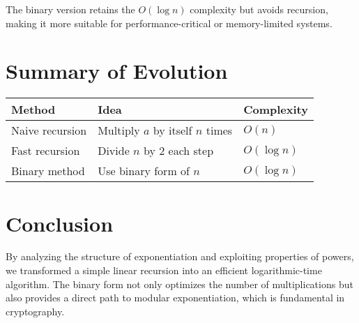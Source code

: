\documentclass[a4paper,12pt]{article}
\begin{document}
The binary version retains the \( O(\log n) \) complexity but avoids recursion,
making it more suitable for performance-critical or memory-limited systems.

\section{Summary of Evolution}

\begin{center}
    \begin{tabular}{|l|l|l|}
        \hline
        \textbf{Method} & \textbf{Idea} & \textbf{Complexity} \\
        \hline
        Naive recursion & Multiply $a$ by itself $n$ times & $O(n)$ \\
        Fast recursion & Divide $n$ by 2 each step & $O(\log n)$ \\
        Binary method & Use binary form of $n$ & $O(\log n)$ \\
        \hline
    \end{tabular}
\end{center}

\section{Conclusion}

By analyzing the structure of exponentiation and exploiting properties of powers,
we transformed a simple linear recursion into an efficient logarithmic-time algorithm.
The binary form not only optimizes the number of multiplications but also
provides a direct path to modular exponentiation, which is fundamental in cryptography.
\end{document}
